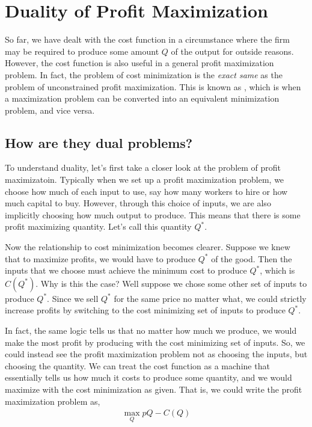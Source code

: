 \section{Duality of Profit Maximization}
So far, we have dealt with the cost function in a circumstance where the firm may be required to produce some amount $Q$ of the output for outside reasons. However, the cost function is also useful in a general profit maximization problem. In fact, the problem of cost minimization is the \emph{exact same} as the problem of unconstrained profit maximization. This is known as , which is when a maximization problem can be converted into an equivalent minimization problem, and vice versa.

\subsection*{How are they dual problems?}
To understand duality, let's first take a closer look at the problem of profit maximizatoin. Typically when we set up a profit maximization problem, we choose how much of each input to use, say how many workers to hire or how much capital to buy. However, through this choice of inputs, we are also implicitly choosing how much output to produce. This means that there is some profit maximizing quantity. Let's call this quantity $Q^*$.

Now the relationship to cost minimization becomes clearer. Suppose we knew that to maximize profits, we would have to produce $Q^*$ of the good. Then the inputs that we choose must achieve the minimum cost to produce $Q^*$, which is $C(Q^*)$. Why is this the case? Well suppose we chose some other set of inputs to produce $Q^*$. Since we sell $Q^*$ for the same price no matter what, we could strictly increase profits by switching to the cost minimizing set of inputs to produce $Q^*$. 

In fact, the same logic tells us that no matter how much we produce, we would make the most profit by producing with the cost minimizing set of inputs. So, we could instead see the profit maximization problem not as choosing the inputs, but choosing the quantity. We can treat the cost function as a machine that essentially tells us how much it costs to produce some quantity, and we would maximize with the cost minimization as given. That is, we could write the profit maximization problem as,
\begin{align*}
    \max_{Q} pQ - C(Q)
\end{align*}

